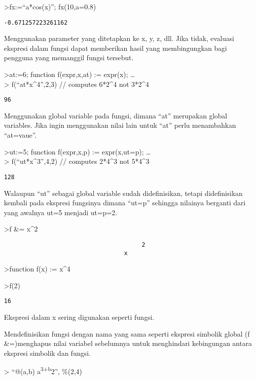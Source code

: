 \documentclass[
]{book}
\begin{document}
\textgreater fx:=``a*cos(x)''; fx(10,a=0.8)

\begin{verbatim}
-0.671257223261162
\end{verbatim}

Menggunakan parameter yang ditetapkan ke x, y, z, dll. Jika tidak, evaluasi ekspresi dalam fungsi dapat memberikan hasil yang membingungkan bagi pengguna yang memanggil fungsi tersebut.

\textgreater at:=6; function f(expr,x,at) := expr(x); \ldots{}\\
\textgreater{} f(``at*x\^{}4'',2,3) // computes 6*2\^{}4 not 3*2\^{}4

\begin{verbatim}
96
\end{verbatim}

Menggunakan global variable pada fungsi, dimana ``at'' merupakan global variables. Jika ingin menggunakan nilai lain untuk ``at'' perlu menambahkan ``at=vaue''.

\textgreater ut:=5; function f(expr,x,p) := expr(x,ut=p); \ldots{}\\
\textgreater{} f(``ut*x\^{}3'',4,2) // computes 2*4\^{}3 not 5*4\^{}3

\begin{verbatim}
128
\end{verbatim}

Walaupun ``ut'' sebagai global variable sudah didefinisikan, tetapi didefinisikan kembali pada ekspresi fungsinya dimana ``ut=p'' sehingga nilainya berganti dari yang awalnya ut=5 menjadi ut=p=2.

\textgreater f \&= x\^{}2

\begin{verbatim}
                                       2
                                  x
\end{verbatim}

\textgreater function f(x) := x\^{}4

\textgreater f(2)

\begin{verbatim}
16
\end{verbatim}

Ekspresi dalam x sering digunakan seperti fungsi.

Mendefinisikan fungsi dengan nama yang sama seperti ekspresi simbolik global (f \&=)menghapus nilai variabel sebelumnya untuk menghindari kebingungan antara ekspresi simbolik dan fungsi.

\textgreater{} ``@(a,b) a\textsuperscript{3+b}2'', \%(2,4)
\end{document}

